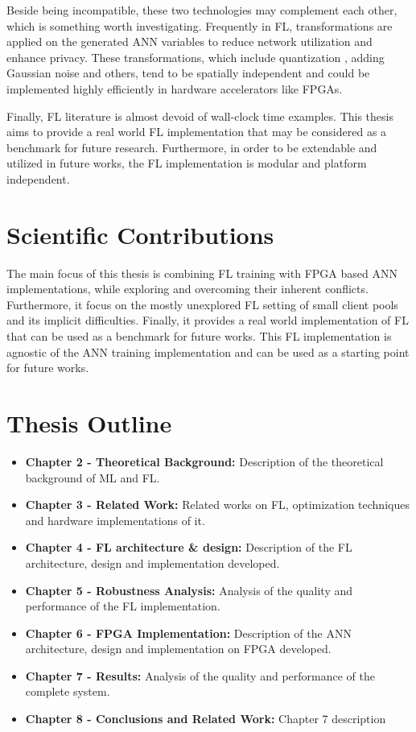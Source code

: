 Beside being incompatible, these two technologies may complement each other, which is something worth investigating. Frequently in FL, transformations are applied on the generated ANN variables to reduce network utilization and enhance privacy. These transformations, which include quantization \cite{Mills2020}, adding Gaussian noise \cite{Wei2020} and others, tend to be spatially independent and could be implemented highly efficiently in hardware accelerators like FPGAs.

Finally, FL literature is almost devoid of wall-clock time examples. This thesis aims to provide a real world FL implementation that may be considered as a benchmark for future research. Furthermore, in order to be extendable and utilized in future works, the FL implementation is modular and platform independent.


\section{Scientific Contributions}

The main focus of this thesis is combining FL training with FPGA based ANN implementations, while exploring and overcoming their inherent conflicts. Furthermore, it focus on the mostly unexplored FL setting of small client pools and its implicit difficulties. Finally, it provides a real world implementation of FL that can be used as a benchmark for future works. This FL implementation is agnostic of the ANN training implementation and can be used as a starting point for future works.

\section{Thesis Outline}
\begin{itemize}
    \item \textbf{Chapter 2 - Theoretical Background:} Description of the theoretical background of ML and FL.
    \item \textbf{Chapter 3 - Related Work:} Related works on FL, optimization techniques and hardware implementations of it.
    \item \textbf{Chapter 4 - FL architecture \& design:} Description of the FL architecture, design and implementation developed.
    \item \textbf{Chapter 5 - Robustness Analysis:} Analysis of the quality and performance of the FL implementation.
    \item \textbf{Chapter 6 - FPGA Implementation:} Description of the ANN architecture, design and implementation on FPGA developed.
    \item \textbf{Chapter 7 - Results:} Analysis of the quality and performance of the complete system.
    \item \textbf{Chapter 8 - Conclusions and Related Work:} Chapter 7 description
\end{itemize}
